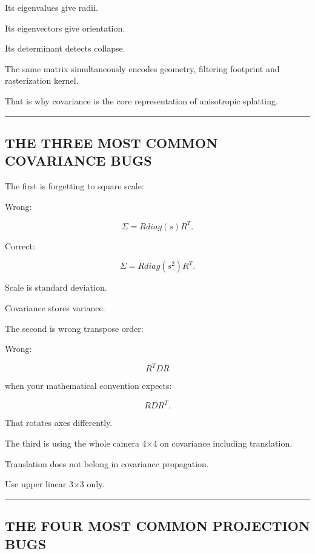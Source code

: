 Its eigenvalues give radii.

Its eigenvectors give orientation.

Its determinant detects collapse.

The same matrix simultaneously encodes geometry, filtering footprint and rasterization kernel.

That is why covariance is the core representation of anisotropic splatting.

\begin{center}\rule{0.5\linewidth}{0.5pt}\end{center}

\subsection{THE THREE MOST COMMON COVARIANCE BUGS}\label{04-visual-computing-ii-ch038-the-three-most-common-covariance-bugs}

\hypertarget{04-visual-computing-ii-ch038-the-three-most-common-covariance-bugs}{}

The first is forgetting to square scale:

Wrong:

\[
\Sigma=
R
diag(s)
R^T.
\]

Correct:

\[
\boxed{
\Sigma=
R
diag(s^2)
R^T.
}
\]

Scale is standard deviation.

Covariance stores variance.

The second is wrong transpose order:

Wrong:

\[
R^TDR
\]

when your mathematical convention expects:

\[
RDR^T.
\]

That rotates axes differently.

The third is using the whole camera 4×4 on covariance including translation.

Translation does not belong in covariance propagation.

Use upper linear 3×3 only.

\begin{center}\rule{0.5\linewidth}{0.5pt}\end{center}

\subsection{THE FOUR MOST COMMON PROJECTION BUGS}\label{04-visual-computing-ii-ch038-the-four-most-common-projection-bugs}

